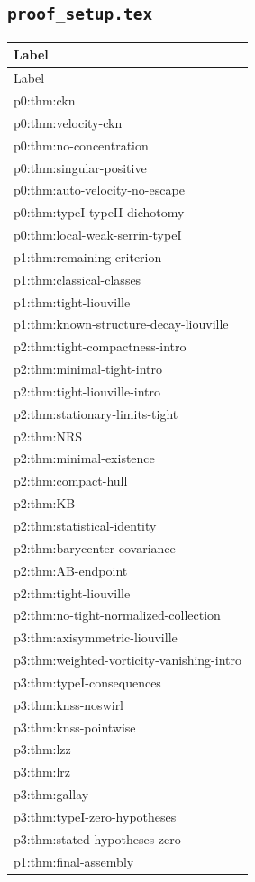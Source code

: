 \documentclass[11pt]{amsart}
\begin{document}
\subsection{\texorpdfstring{\texttt{proof\_setup.tex}}{proof setup.tex}}

\begin{longtable}{@{}>{\ttfamily\footnotesize\raggedright\arraybackslash}p{}@{}}
\toprule
Label\\
\midrule
\endfirsthead
\toprule
Label\\
\midrule
\endhead
p0:thm:ckn\\
p0:thm:velocity-ckn\\
p0:thm:no-concentration\\
p0:thm:singular-positive\\
p0:thm:auto-velocity-no-escape\\
p0:thm:typeI-typeII-dichotomy\\
p0:thm:local-weak-serrin-typeI\\
p1:thm:remaining-criterion\\
p1:thm:classical-classes\\
p1:thm:tight-liouville\\
p1:thm:known-structure-decay-liouville\\
p2:thm:tight-compactness-intro\\
p2:thm:minimal-tight-intro\\
p2:thm:tight-liouville-intro\\
p2:thm:stationary-limits-tight\\
p2:thm:NRS\\
p2:thm:minimal-existence\\
p2:thm:compact-hull\\
p2:thm:KB\\
p2:thm:statistical-identity\\
p2:thm:barycenter-covariance\\
p2:thm:AB-endpoint\\
p2:thm:tight-liouville\\
p2:thm:no-tight-normalized-collection\\
p3:thm:axisymmetric-liouville\\
p3:thm:weighted-vorticity-vanishing-intro\\
p3:thm:typeI-consequences\\
p3:thm:knss-noswirl\\
p3:thm:knss-pointwise\\
p3:thm:lzz\\
p3:thm:lrz\\
p3:thm:gallay\\
p3:thm:typeI-zero-hypotheses\\
p3:thm:stated-hypotheses-zero\\
p1:thm:final-assembly\\
\bottomrule
\end{longtable}
\end{document}
